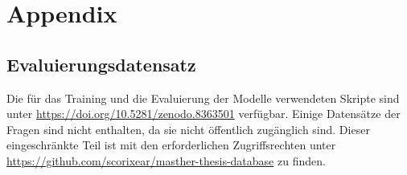 \chapter*{Appendix}\label{ch:appendix}
\section*{Evaluierungsdatensatz}\label{app:evaldata}
Die für das Training und die Evaluierung der Modelle verwendeten Skripte sind unter \url{https://doi.org/10.5281/zenodo.8363501} verfügbar.
Einige Datensätze der Fragen sind nicht enthalten, da sie nicht öffentlich zugänglich sind.
Dieser eingeschränkte Teil ist mit den erforderlichen Zugriffsrechten unter \url{https://github.com/scorixear/masther-thesis-database} zu finden.

